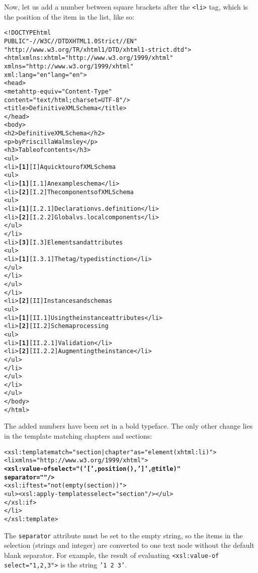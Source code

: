 Now, let us add a number between square brackets after the \XHTML
\texttt{<li>} tag, which is the position of the item in the list, like
so:
\begin{alltt}
<!DOCTYPE html
  PUBLIC "-//W3C//DTD XHTML 1.0 Strict//EN" 
         "http://www.w3.org/TR/xhtml1/DTD/xhtml1-strict.dtd">
<html xmlns:xhtml="http://www.w3.org/1999/xhtml" 
      xmlns="http://www.w3.org/1999/xhtml"
      xml:lang="en" lang="en">
  <head>
    <meta http-equiv="Content-Type"
          content="text/html; charset=UTF-8"/>
    <title>Definitive XML Schema</title>
  </head>
  <body>
    <h2>Definitive XML Schema</h2>
    <p>by Priscilla Walmsley</p>
    <h3>Table of contents</h3>
    <ul>
      <li>\textbf{[1]} [I] A quick tour of XML Schema
        <ul>
          <li>\textbf{[1]} [I.1] An example schema</li>
          <li>\textbf{[2]} [I.2] The components of XML Schema
            <ul>
              <li>\textbf{[1]} [I.2.1] Declaration vs. definition</li>
              <li>\textbf{[2]} [I.2.2] Global vs. local components</li>
            </ul>
          </li>
          <li>\textbf{[3]} [I.3] Elements and attributes
            <ul>
              <li>\textbf{[1]} [I.3.1] The tag/type distinction</li>
            </ul>
          </li>
        </ul>
      </li>
      <li>\textbf{[2]} [II] Instances and schemas
        <ul>
          <li>\textbf{[1]} [II.1] Using the instance attributes</li>
          <li>\textbf{[2]} [II.2] Schema processing
            <ul>
              <li>\textbf{[1]} [II.2.1] Validation</li>
              <li>\textbf{[2]} [II.2.2] Augmenting the instance</li>
            </ul>
          </li>
        </ul>
      </li>
    </ul>
  </body>
</html>
\end{alltt}
The added numbers have been set in a bold typeface. The only other
change lies in the template matching chapters and sections:
\begin{alltt}
 <xsl:template match="section|chapter" as="element(xhtml:li)">
    <li xmlns="http://www.w3.org/1999/xhtml">
      \textbf{<xsl:value-of select="('[',position(),'] ',@title)" 
                    separator=""/>}
      <xsl:if test="not(empty(section))">
        <ul><xsl:apply-templates select="section"/></ul>
      </xsl:if>
    </li>
  </xsl:template>
\end{alltt}
The \texttt{separator} attribute must be set to the empty string, so
the items in the selection (strings and integer) are converted to one
text node without the default blank separator. For example, the result
of evaluating \texttt{<xsl:value-of select="1,2,3">} is the string
\texttt{'1 2 3'}.

